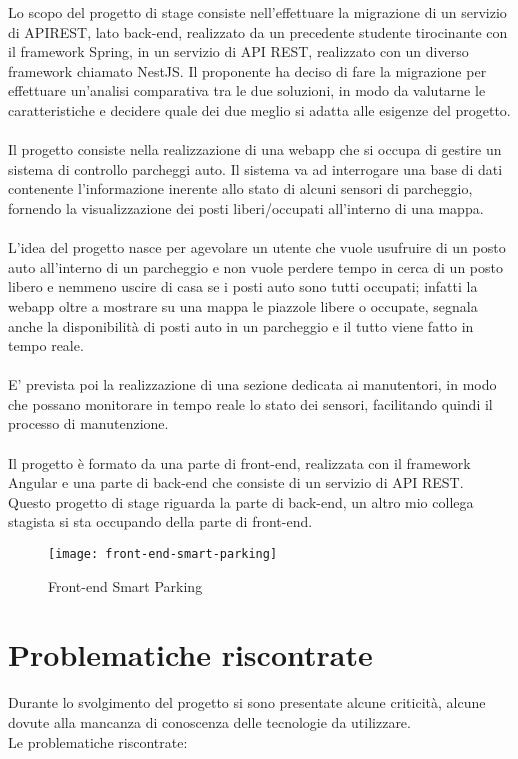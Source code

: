 Lo scopo del progetto di stage consiste nell'effettuare la migrazione di un servizio di
\gls{API}\glsfirstoccur \gls{REST}\glsfirstoccur, lato \gls{back-end}\glsfirstoccur, realizzato da un precedente studente tirocinante con il framework
Spring, in un servizio di \gls{API} \gls{REST}, realizzato con un diverso framework chiamato
NestJS. Il proponente ha deciso di fare la migrazione per effettuare un'analisi comparativa tra le due soluzioni, in
modo da valutarne le caratteristiche e decidere quale dei due meglio si adatta alle esigenze
del progetto.
\\\\
Il progetto consiste nella realizzazione di una webapp che si occupa di gestire un sistema
di controllo parcheggi auto. Il sistema va ad interrogare una base di dati contenente
l'informazione inerente allo stato di alcuni sensori di parcheggio, fornendo la visualizzazione
dei posti liberi/occupati all'interno di una mappa.
\\\\
L'idea del progetto nasce per agevolare un utente che vuole usufruire di un posto auto all'interno di 
un parcheggio e non vuole perdere tempo in cerca di un posto libero e nemmeno uscire di casa se i posti auto
sono tutti occupati; infatti la webapp oltre a mostrare su una mappa le piazzole libere o occupate, segnala 
anche la disponibilità di posti auto in un parcheggio e il tutto viene fatto in tempo reale.
\\\\
E' prevista poi la realizzazione di una sezione dedicata ai manutentori, in modo che possano monitorare
in tempo reale lo stato dei sensori, facilitando quindi il processo di manutenzione.
\\\\
Il progetto è formato da una parte di \gls{front-end}\glsfirstoccur, realizzata con il framework Angular e una 
parte di \gls{back-end} che consiste di un servizio di \gls{API} \gls{REST}.
\\
Questo progetto di stage riguarda la parte di \gls{back-end}, un altro mio collega stagista si sta occupando
della parte di \gls{front-end}.
\clearpage
\begin{figure}[H]
    \centering
    \texttt{[image: front-end-smart-parking]}
    \caption{Front-end Smart Parking}
\end{figure}

\section{Problematiche riscontrate}
Durante lo svolgimento del progetto si sono presentate alcune criticità, alcune dovute alla mancanza
di conoscenza delle tecnologie da utilizzare. 
\\
Le problematiche riscontrate:

